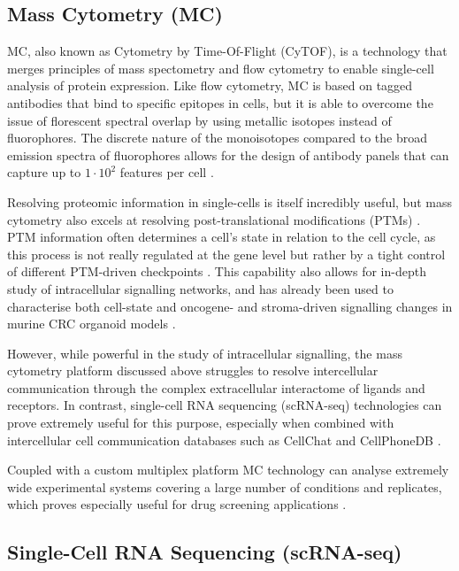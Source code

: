 \subsection{Mass Cytometry (MC)}

MC, also known as Cytometry by Time-Of-Flight (CyTOF), is a technology that merges principles of mass spectometry and flow cytometry to enable single-cell analysis of protein expression. Like flow cytometry, MC is based on tagged antibodies that bind to specific epitopes in cells, but it is able to overcome the issue of florescent spectral overlap by using metallic isotopes instead of fluorophores. The discrete nature of the monoisotopes compared to the broad emission spectra of fluorophores allows for the design of antibody panels that can capture up to \(1\cdot10^2\) features per cell \cite{tracey_cytof_2021}. %

Resolving proteomic information in single-cells is itself incredibly useful, but mass cytometry also excels at resolving post-translational modifications (PTMs) \cite{ochoa_functional_2019}. PTM information often determines a cell's state in relation to the cell cycle, as this process is not really regulated at the gene level but rather by a tight control of different PTM-driven checkpoints \cite{cuijpers_guiding_2018}. This capability also allows for in-depth study of intracellular signalling networks, and has already been used to characterise both cell-state and oncogene- and stroma-driven signalling changes in murine CRC organoid models \cite{qin_cell-type-specific_2020}.

However, while powerful in the study of intracellular signalling, the mass cytometry platform discussed above struggles to resolve intercellular communication through the complex extracellular interactome of ligands and receptors. In contrast, single-cell RNA sequencing (scRNA-seq) technologies can prove extremely useful for this purpose, especially when combined with intercellular cell communication databases such as CellChat \cite{jin_inference_2021} and CellPhoneDB \cite{efremova_cellphonedb_2020}.

Coupled with a custom multiplex platform \cite{sufi_multiplexed_2021} MC technology can analyse extremely wide experimental systems covering a large number of conditions and replicates, which proves especially useful for drug screening applications \cite{zapatero_trellis_2023}.

\subsection{Single-Cell RNA Sequencing (scRNA-seq)}

